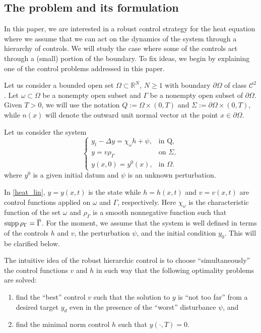 \documentclass[preprint,10pt]{article}
\numberwithin{equation}{section}
\numberwithin{theorem}{section}
\def\cbd{\Gamma}
\def\supp{\textnormal{supp}\,}
\def\csbd{\rho_{\Gamma}}
\newcommand\csin[1]{\chi_{#1}}
\begin{document}
{\subsection{The problem and its formulation}

In this paper, we are interested in a robust control strategy for the heat equation where we assume that we can act on the dynamics of the system through a hierarchy of controls. We will study the case where some of the controls act through a (small) portion of the boundary. To fix ideas, we begin by explaining one of the control problems addressed in this paper. 

Let us consider a bounded open set $\Omega\subset \mathbb{R}^N$, $N\geq 1$ with boundary $\partial \Omega$ of class $\mathcal C^2$. Let $\omega\subset \Omega$ be a nonempty open subset and {$\cbd$ be a nonempty open subset of $\partial \Omega$}.  Given $T>0$, we will use the notation $Q:=\Omega\times(0,T)$ and $\Sigma:=\partial \Omega\times(0,T)$, while $n(x)$ will denote the outward unit normal vector at the point $x\in \partial \Omega$. 

Let us consider the system
%
\begin{equation}\label{heat_lin}
\begin{cases}
y_t-\Delta y=\csin{\omega}h+\psi, & \text{in Q}, \\
y=v\csbd &\text{on } \Sigma, \\
y(x,0)=y^0(x), & \text{in } \Omega.
\end{cases}
\end{equation}
%
where $y^0$ is a given initial datum and $\psi$ is an unknown perturbation.

In \eqref{heat_lin}, $y=y(x,t)$ is the state while $h=h(x,t)$ and $v=v(x,t)$ are control functions applied on $\omega$ and $\Gamma$, respectively. Here $\csin{\omega}$ is the characteristic function of the set $\omega$ and $\csbd$ is a smooth nonnegative function such that $\supp\csbd=\overline \cbd$. For the moment, we assume that the system is well defined in terms of the controls $h$ and $v$, the perturbation $\psi$, and the initial condition $y_0$. This will be clarified below. 

The intuitive idea of the robust hierarchic control is to choose ``simultaneously'' the control functions  $v$ and $h$ in such way that the following optimality problems are solved: 
%
\begin{enumerate}
\item find the ``best'' control $v$ such that the solution to $y$ is ``not too far'' from a desired target $y_d$ even in the presence of the ``worst'' disturbance $\psi$, and
\item find the minimal norm control $h$ such that $y(\cdot,T)=0$. 
\end{enumerate}

}
\end{document}
